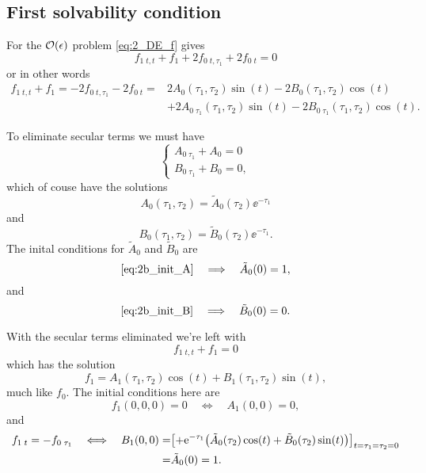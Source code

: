 \documentclass[11pt,letter, swedish, english
]{article}
\begin{document}
\subsection{First solvability condition}
For the $\order{\epsilon}$ problem \eqref{eq:2_DE_f} gives
\begin{equation}\label{eq:2c_f1_0}
f_{1\;t,t}+f_1 + 2f_{0\;t,\tau_1} +2f_{0\;t}=0
\end{equation}
or in other words
\begin{equation}\label{eq:2c_f1_1}
\begin{aligned}
f_{1\;t,t}+f_1 = -2f_{0\;t,\tau_1} -2f_{0\;t}
=&2A_0(\tau_1, \tau_2)\sin(t) - 2B_0(\tau_1, \tau_2)\cos(t)\\
&+ 2A_{0\;\tau_1}(\tau_1, \tau_2)\sin(t) 
- 2B_{0\;\tau_1}(\tau_1, \tau_2)\cos(t).
\end{aligned}
\end{equation}

To eliminate secular terms we must have
\begin{equation}
\begin{cases}
A_{0\;\tau_1}+A_0=0\\
B_{0\;\tau_1}+B_0=0,
\end{cases}
\end{equation}
which of couse have the solutions
\begin{equation}
A_0(\tau_1, \tau_2)=\tilde{A}_0(\tau_2)\ee^{-\tau_1}
\end{equation}
and
\begin{equation}
B_0(\tau_1, \tau_2)=\tilde{B}_0(\tau_2)\ee^{-\tau_1}.
\end{equation}
The inital conditions for $\tilde{A}_0$ and $\tilde{B}_0$ are
\begin{equation}\label{eq:2_init_tildeA}
\eqref{eq:2b_init_A}\quad\Longrightarrow\quad
\tilde{A}_0(0)=1,
\end{equation}
and
\begin{equation}\label{eq:2_init_tildeB}
\eqref{eq:2b_init_B}\quad\Longrightarrow\quad
\tilde{B}_0(0)=0.
\end{equation}

With the secular terms eliminated we're left with
\begin{equation}
f_{1\;t,t}+f_1 =0
\end{equation}
which has the solution
\begin{equation}\label{eq:2_f1}
f_1=A_1(\tau_1, \tau_2)\cos(t)+B_1(\tau_1, \tau_2)\sin(t),
\end{equation}
much like $f_0$. The initial conditions here are
\begin{equation}
f_1(0, 0, 0)=0\quad\Longleftrightarrow\quad
A_1(0, 0)=0,
\end{equation}
and
\begin{equation}
\begin{aligned}
f_{1\;t}=-f_{0\;\tau_1}
\quad\Longleftrightarrow\quad
B_1(0, 0) =& \qty[+\mathrm{e}^{-\tau_1}\qty(
\tilde{A}_0(\tau_2)\cos(t)+\tilde{B}_0(\tau_2)\sin(t)
)]_{t=\tau_1=\tau_2=0}\\
=&\tilde{A}_0(0)=1.
\end{aligned}
\end{equation}
\end{document}
